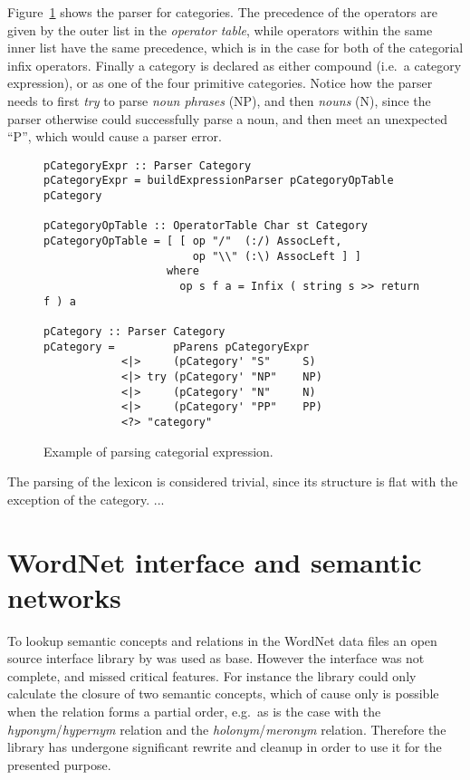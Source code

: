 Figure~\ref{fig:categoryExpression} shows the parser for categories. The precedence of the operators are given by the outer list in the \emph{operator table}, while operators within the same inner list have the same precedence, which is in the case for both of the categorial infix operators. Finally a category is declared as either compound (i.e.\ a category expression), or as one of the four primitive categories. Notice how the parser needs to first \emph{try} to parse \emph{noun phrases} (NP), and then \emph{nouns} (N), since the parser otherwise could successfully parse a noun, and then meet an unexpected ``P'', which would cause a parser error.

\begin{figure}[ht]
\begin{cframed}{.9\textwidth}
\begin{lstlisting}[language=GHC]
pCategoryExpr :: Parser Category
pCategoryExpr = buildExpressionParser pCategoryOpTable pCategory

pCategoryOpTable :: OperatorTable Char st Category
pCategoryOpTable = [ [ op "/"  (:/) AssocLeft, 
                       op "\\" (:\) AssocLeft ] ]
                   where 
                     op s f a = Infix ( string s >> return f ) a

pCategory :: Parser Category
pCategory =         pParens pCategoryExpr
            <|>     (pCategory' "S"     S)
            <|> try (pCategory' "NP"    NP)
            <|>     (pCategory' "N"     N)
            <|>     (pCategory' "PP"    PP)
            <?> "category" 
\end{lstlisting}	
\end{cframed}
\caption{Example of parsing categorial expression.}
\label{fig:categoryExpression}
\end{figure}
\vspace{1em}

The parsing of the lexicon is considered trivial, since its structure is flat with the exception of the category. ...


\vspace{7em}

\section{WordNet interface and semantic networks}
To lookup semantic concepts and relations in the WordNet data files an open source interface library by \citeauthor{hwordnet}  was used as base. However the interface was not complete, and missed critical features. For instance the library could only calculate the closure of two semantic concepts, which of cause only is possible when the relation forms a partial order, e.g.\ as is the case with the \emph{hyponym}/\emph{hypernym} relation and the \emph{holonym}/\emph{meronym} relation. Therefore the library has undergone significant rewrite and cleanup in order to use it for the presented purpose.

